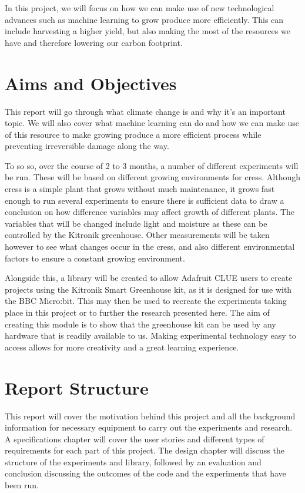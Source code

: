 \documentclass[11pt]{informatics-report}
\begin{document}
In this project, we will focus on how we can make use of new technological advances such as machine learning to grow produce more efficiently. This can include harvesting a higher yield, but also making the most of the resources we have and therefore lowering our carbon footprint.

\section{Aims and Objectives}
This report will go through what climate change is and why it's an important topic. We will also cover what machine learning can do and how we can make use of this resource to make growing produce a more efficient process while preventing irreversible damage along the way.

To so so, over the course of 2 to 3 months, a number of different experiments will be run. These will be based on different growing environments for cress. Although cress is a simple plant that grows without much maintenance, it grows fast enough to run several experiments to ensure there is sufficient data to draw a conclusion on how difference variables may affect growth of different plants. The variables that will be changed include light and moisture as these can be controlled by the Kitronik greenhouse. Other measurements will be taken however to see what changes occur in the cress, and also different environmental factors to ensure a constant growing environment.

Alongside this, a library will be created to allow Adafruit CLUE users to create projects using the Kitronik Smart Greenhouse kit, as it is designed for use with the BBC Micro:bit. This may then be used to recreate the experiments taking place in this project or to further the research presented here. The aim of creating this module is to show that the greenhouse kit can be used by any hardware that is readily available to us. Making experimental technology easy to access allows for more creativity and a great learning experience.

\section{Report Structure}

This report will cover the motivation behind this project and all the background information for necessary equipment to carry out the experiments and research. A specifications chapter will cover the user stories and different types of requirements for each part of this project. The design chapter will discuss the structure of the experiments and library, followed by an evaluation and conclusion discussing the outcomes of the code and the experiments that have been run.
\end{document}
